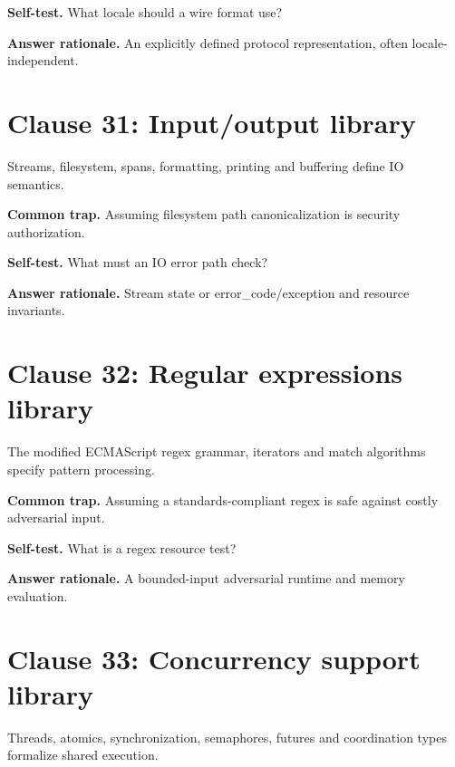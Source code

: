 \documentclass[11pt]{article}
\begin{document}
\textbf{Self-test.} What locale should a wire format use?

\textbf{Answer rationale.} An explicitly defined protocol representation, often locale-independent.

\section{Clause 31: Input/output library}
Streams, filesystem, spans, formatting, printing and buffering define IO semantics.

\textbf{Common trap.} Assuming filesystem path canonicalization is security authorization.

\textbf{Self-test.} What must an IO error path check?

\textbf{Answer rationale.} Stream state or error\_code/exception and resource invariants.

\section{Clause 32: Regular expressions library}
The modified ECMAScript regex grammar, iterators and match algorithms specify pattern processing.

\textbf{Common trap.} Assuming a standards-compliant regex is safe against costly adversarial input.

\textbf{Self-test.} What is a regex resource test?

\textbf{Answer rationale.} A bounded-input adversarial runtime and memory evaluation.

\section{Clause 33: Concurrency support library}
Threads, atomics, synchronization, semaphores, futures and coordination types formalize shared execution.
\end{document}

